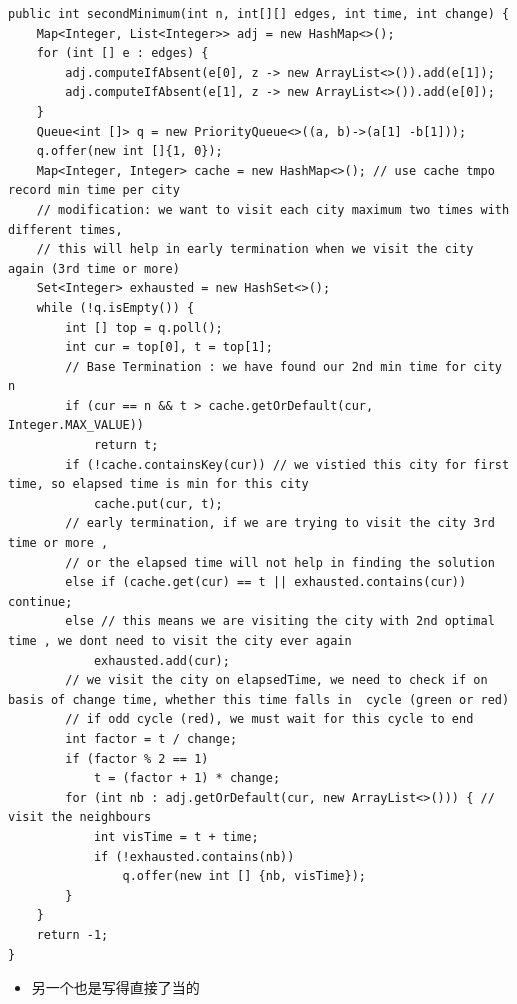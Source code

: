 \documentclass[9pt, b5paaper]{book}
\begin{document}
\begin{verbatim}
public int secondMinimum(int n, int[][] edges, int time, int change) {
    Map<Integer, List<Integer>> adj = new HashMap<>();
    for (int [] e : edges) {
        adj.computeIfAbsent(e[0], z -> new ArrayList<>()).add(e[1]);
        adj.computeIfAbsent(e[1], z -> new ArrayList<>()).add(e[0]);
    }
    Queue<int []> q = new PriorityQueue<>((a, b)->(a[1] -b[1]));
    q.offer(new int []{1, 0});
    Map<Integer, Integer> cache = new HashMap<>(); // use cache tmpo record min time per city
    // modification: we want to visit each city maximum two times with different times,
    // this will help in early termination when we visit the city again (3rd time or more)
    Set<Integer> exhausted = new HashSet<>();
    while (!q.isEmpty()) {
        int [] top = q.poll();
        int cur = top[0], t = top[1];
        // Base Termination : we have found our 2nd min time for city n
        if (cur == n && t > cache.getOrDefault(cur, Integer.MAX_VALUE))
            return t;
        if (!cache.containsKey(cur)) // we vistied this city for first time, so elapsed time is min for this city
            cache.put(cur, t);
        // early termination, if we are trying to visit the city 3rd time or more ,
        // or the elapsed time will not help in finding the solution
        else if (cache.get(cur) == t || exhausted.contains(cur)) continue;
        else // this means we are visiting the city with 2nd optimal time , we dont need to visit the city ever again
            exhausted.add(cur);
        // we visit the city on elapsedTime, we need to check if on basis of change time, whether this time falls in  cycle (green or red)
        // if odd cycle (red), we must wait for this cycle to end
        int factor = t / change;
        if (factor % 2 == 1)
            t = (factor + 1) * change;
        for (int nb : adj.getOrDefault(cur, new ArrayList<>())) { // visit the neighbours
            int visTime = t + time;
            if (!exhausted.contains(nb))
                q.offer(new int [] {nb, visTime});
        }
    }
    return -1;
}
\end{verbatim}
\begin{itemize}
\item 另一个也是写得直接了当的
\end{itemize}
\end{document}
